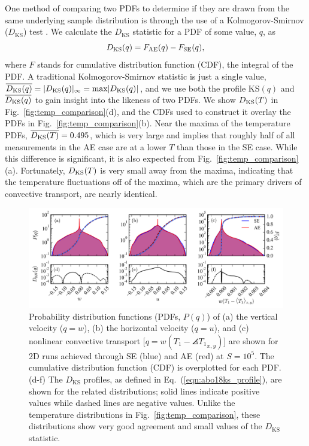 One method of comparing two PDFs to determine if they are drawn from the same underlying sample distribution is through the use of a Kolmogorov-Smirnov ($D_{\text{KS}}$) test \citep{wall&jenkins2012}.
We calculate the $D_{\text{KS}}$ statistic for a PDF of some value, $q$, as
\begin{equation}
D_{\text{KS}}(q) = F_{\text{AE}}(q) - F_{\text{SE}}(q),
\label{eqn:abo18ks_profile}
\end{equation}
where $F$ stands for cumulative distribution function (CDF), the integral of the PDF.
A traditional Kolmogorov-Smirnov statistic is just a single value, $\overline{D_\text{KS}(q)} = |D_{\text{KS}}(q)|_\infty = \text{max} |D_{\text{KS}}(q)|$, and we use both the profile KS$(q)$ and $\overline{D_\text{KS}(q)}$ to gain insight into the likeness of two PDFs. 
We show $D_{\text{KS}}(T)$ in Fig.~\ref{fig:temp_comparison}(d), and the CDFs used to construct it overlay the PDFs in Fig.~\ref{fig:temp_comparison}(b).
Near the maxima of the temperature PDFs, $\overline{D_\text{KS}(T)} = 0.495$, which is very large and implies that roughly half of all measurements in the AE case are at a lower $T$ than those in the SE case.
While this difference is significant, it is also expected from Fig.~\ref{fig:temp_comparison}(a).
Fortunately, $D_{\text{KS}}(T)$ is very small away from the maxima, indicating that the temperature fluctuations off of the maxima, which are the primary drivers of convective transport, are nearly identical.

\begin{figure}[bt!]
\includegraphics[width=\textwidth]{./figs/pdf_comparison.pdf}
\caption[Probability distribution comparison of AE and SE dynamics]
{
	Probability distribution functions (PDFs, $P(q)$) of (a) the vertical velocity ($q = w$), (b) the horizontal velocity ($q = u$), and (c) nonlinear convective transport [$q = w(T_1 - \angles{T_1}_{x,y})$] are shown for 2D runs achieved through SE (blue) and AE (red) at $S = 10^{5}$.  
	The cumulative distribution function (CDF) is overplotted for each PDF. 
	(d-f) The $D_{\text{KS}}$ profiles, as defined in Eq.~(\ref{eqn:abo18ks_profile}), are shown for the related distributions; solid lines indicate positive values while dashed lines are negative values. 
	Unlike the temperature distributions in Fig.~\ref{fig:temp_comparison}, these distributions show very good agreement and small values of the $D_{\text{KS}}$ statistic.
	\label{fig:pdf_comparison} 
}
\end{figure}

